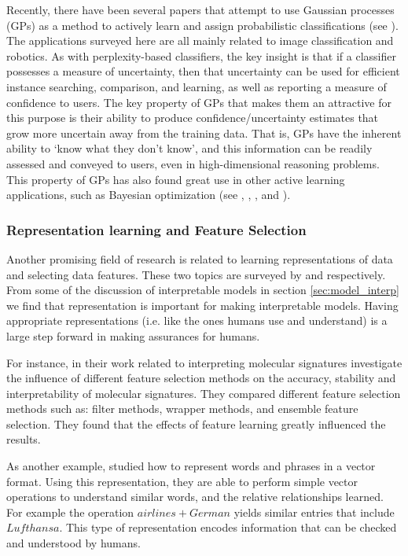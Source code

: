     Recently, there have been several papers that attempt to use Gaussian processes (GPs) as a method to actively learn and assign probabilistic classifications (see \citet{MacKay1992-sp,Triebel2016-kj,Triebel2013-ow,Triebel2013-ku,Grimmett2013-gj,Grimmett2016-yc,Berczi2015-rd,Dequaire2016-kh}). The applications surveyed here are all mainly related to image classification and robotics. As with perplexity-based classifiers, the key insight is that if a classifier possesses a measure of uncertainty, then that uncertainty can be used for efficient instance searching, comparison, and learning, as well as reporting a measure of confidence to users. The key property of GPs that makes them an attractive for this purpose is their ability to produce confidence/uncertainty estimates that grow more uncertain away from the training data. That is, GPs have the inherent ability to `know what they don't know', and this information can be readily assessed and conveyed to users, even in high-dimensional reasoning problems. This property of GPs has also found great use in other active learning applications, such as  Bayesian optimization (see \citet{Williams1998-kr}, \citet{Snoek2012-tt}, \citet{Brochu2010-tj}, and \citet{Israelsen2017-zb}).

\subsubsection{Representation learning and Feature Selection} \label{sec:rep_learning}
    Another promising field of research is related to learning representations of data and selecting data features. These two topics are surveyed by \citet{Bengio2013-uv} and \citet{Guyon2003-fj} respectively. From some of the discussion of interpretable models in section \ref{sec:model_interp} we find that representation is important for making interpretable models. Having appropriate representations (i.e. like the ones humans use and understand) is a large step forward in making assurances for humans.

    For instance, in their work related to interpreting molecular signatures \citet{Haury2011-zi} investigate the influence of different feature selection methods on the accuracy, stability and interpretability of molecular signatures. They compared different feature selection methods such as: filter methods, wrapper methods, and ensemble feature selection. They found that the effects of feature learning greatly influenced the results. 

    As another example, \citet{Mikolov2013-lt} studied how to represent words and phrases in a vector format. Using this representation, they are able to perform simple vector operations to understand similar words, and the relative relationships learned. For example the operation $airlines+German$ yields similar entries that include $Lufthansa$. This type of representation encodes information that can be checked and understood by humans. 
    
